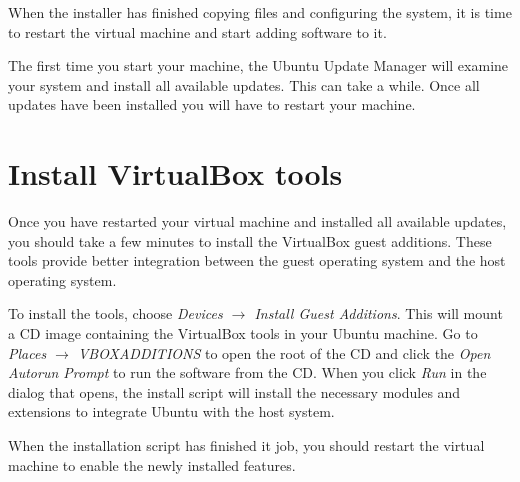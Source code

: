 \documentclass[ebook,10pt,twoside,openright]{memoir}
\begin{document}

When the installer has finished copying files and configuring the system, it is time to restart the virtual machine and start adding software to it.

The first time you start your machine, the Ubuntu Update Manager will examine your system and install all available updates. This can take a while. Once all updates have been installed you will have to restart your machine.


\section{Install VirtualBox tools} \label{secinstallvirtualboxtools}

Once you have restarted your virtual machine and installed all available updates, you should take a few minutes to install the VirtualBox guest additions. These tools provide better integration between the guest operating system and the host operating system.

To install the tools, choose \emph{Devices $\rightarrow$ Install Guest Additions}. This will mount a CD image containing the VirtualBox tools in your Ubuntu machine. Go to \emph{Places $\rightarrow$ VBOXADDITIONS} to open the root of the CD and click the \emph{Open Autorun Prompt} to run the software from the CD. When you click \emph{Run} in the dialog that opens, the install script will install the necessary modules and extensions to integrate Ubuntu with the host system.

When the installation script has finished it job, you should restart the virtual machine to enable the newly installed features.


\end{document}
